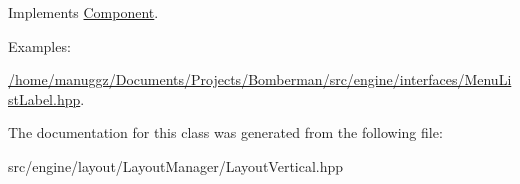 Implements \hyperlink{class_component_aa471f2c3a24525f584ed19cf25222e70}{Component}.

\begin{Desc}
\item[Examples\+: ]\par
\hyperlink{_2home_2manuggz_2_documents_2_projects_2_bomberman_2src_2engine_2interfaces_2_menu_list_label_8hpp-example}{/home/manuggz/\+Documents/\+Projects/\+Bomberman/src/engine/interfaces/\+Menu\+List\+Label.\+hpp}.\end{Desc}


The documentation for this class was generated from the following file\+:\begin{DoxyCompactItemize}
\item 
src/engine/layout/\+Layout\+Manager/Layout\+Vertical.\+hpp\end{DoxyCompactItemize}
